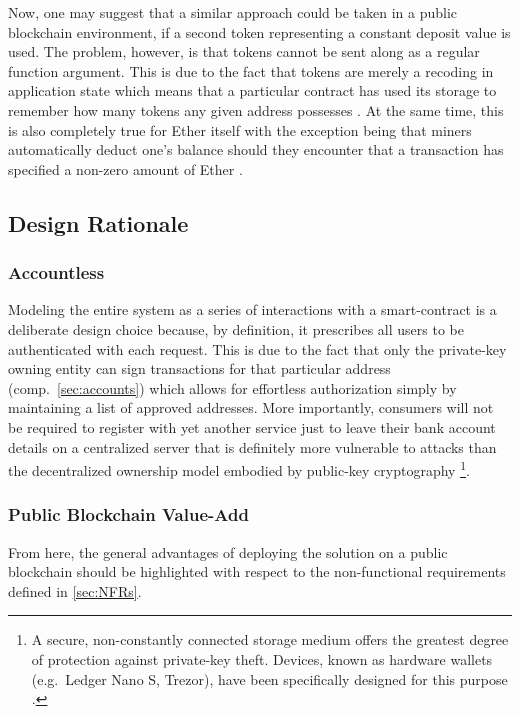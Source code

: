 \begin{description}
	Now, one may suggest that a similar approach could be taken in a public blockchain environment, if a second token representing a constant deposit value is used. The problem, however, is that tokens cannot be sent along as a regular function argument. This is due to the fact that tokens are merely a recoding in application state which means that a particular contract has used its storage to remember how many tokens any given address possesses \cite{}. At the same time, this is also completely true for Ether itself with the exception being that miners automatically deduct one's balance should they encounter that a transaction has specified a non-zero amount of Ether \cite{}.
\end{description}

\subsection{Design Rationale}
\subsubsection{Accountless}
Modeling the entire system as a series of interactions with a smart-contract is a deliberate design choice because, by definition, it prescribes all users to be authenticated with each request. This is due to the fact that only the private-key owning entity can sign transactions for that particular address (comp.~\ref{sec:accounts}) which allows for effortless authorization simply by maintaining a list of approved addresses. More importantly, consumers will not be required to register with yet another service just to leave their bank account details on a centralized server that is definitely more vulnerable to attacks than the decentralized ownership model embodied by public-key cryptography \footnote{A secure, non-constantly connected storage medium offers the greatest degree of protection against private-key theft. Devices, known as hardware wallets (e.g.~Ledger Nano S, Trezor), have been specifically designed for this purpose \cite{}.}. 

\subsubsection{Public Blockchain Value-Add}
From here, the general advantages of deploying the solution on a public blockchain should be highlighted with respect to the non-functional requirements defined in \autoref{sec:NFRs}.

